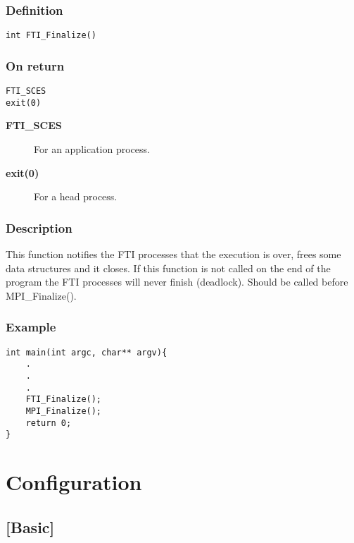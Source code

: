 \documentclass{refrep}
\begin{document}
\subsection*{Definition}
\begin{lstlisting}[frame=single]
int FTI_Finalize()
\end{lstlisting}
\subsection*{On return}
\begin{lstlisting}[frame=single]
FTI_SCES
exit(0)
\end{lstlisting}
\begin{description}
\item[\textbf{FTI\_SCES}] For an application process.
\item[\textbf{exit(0)}] For a head process.
\end{description}
\subsection*{Description}
This function notifies the FTI processes that the execution is over, frees some data structures and it closes. If this function is not called on the end of the program the FTI processes will never finish (deadlock). Should be called before MPI\_Finalize().
\subsection*{Example}
\begin{center}
\begin{lstlisting}[frame=single]
int main(int argc, char** argv){
    .
    .
    .
    FTI_Finalize();
    MPI_Finalize();
    return 0;
}
\end{lstlisting}
\end{center}
\chapter{Configuration}\label{ch:configuration}
\section{[Basic]}\label{sec:basic}
\end{document}
